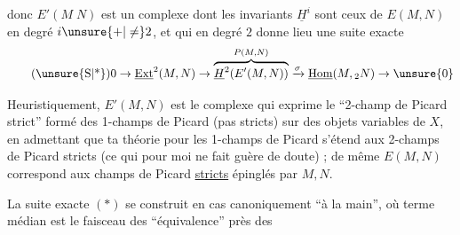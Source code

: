 \margin{\mbox{-- --}}

donc $E'(M\;N)$ est un complexe dont les invariants $\underline{H}^{i}$ sont ceux de $E(M,N)$ en degré $i\unsure{+|\ne}2$, et qui en degré $2$ donne lieu  une suite exacte
\begingroup
\makeatletter\tagsleft@true\makeatother
\[
\tag*{(\unsure{S|*})}
0\to\underline{\mathrm{Ext}}^{2}(M,N)\to
\overbrace{\underline{H}^{2}\!\left(E'(M,N)\right)}^{P(M,N)}
\xrightarrow{\sigma}\underline{\mathrm{Hom}}(M,{}_{2}N)\to \unsure{0}
\]
\endgroup

Heuristiquement, $E'(M,N)$ est le complexe qui exprime le ``2-champ de Picard strict'' formé des 1-champs de Picard (pas  stricts)  sur des objets variables de $X$, en admettant que ta théorie pour les 1-champs de Picard  s'étend aux 2-champs de Picard stricts (ce qui pour  moi ne fait guère de doute) ; de même $E(M,N)$ correspond aux champs de Picard \uline{stricts} épinglés par $M,N$.

La suite exacte $(*)$ se construit en  cas canoniquement ``à la main'', où  terme médian est le faisceau des   ``équivalence'' près des

